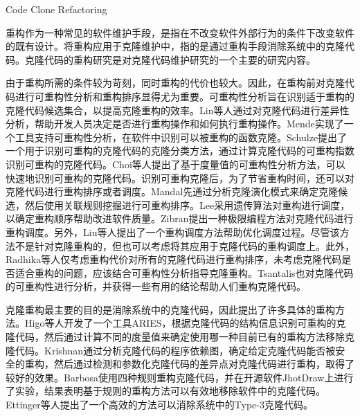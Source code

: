 {Code Clone Refactoring}
\label{ref-clonerefactoring}

重构作为一种常见的软件维护手段，是指在不改变软件外部行为的条件下改变软件的既有设计\cite{kerievsky2006重构与模式}。将重构应用于克隆维护中，指的是通过重构手段消除系统中的克隆代码。克隆代码的重构研究是对克隆代码维护研究的一个主要的研究内容。

由于重构所需的条件较为苛刻，同时重构的代价也较大。因此，在重构前对克隆代码进行可重构性分析和重构排序显得尤为重要。可重构性分析旨在识别适于重构的克隆代码候选集合，以提高克隆重构的效率\cite{lin2014detecting}\cite{mende2009evaluation}\cite{schulze2008towards}\cite{choi2011extracting}。Lin等人通过对克隆代码进行差异性分析，帮助开发人员决定是否进行重构操作和如何执行重构操作\cite{lin2014detecting}。Mende实现了一个工具支持可重构性分析，在软件中识别可以被重构的函数克隆\cite{mende2009evaluation}。Schulze提出了一个用于识别可重构的克隆代码的克隆分类方法，通过计算克隆代码的可重构指数识别可重构的克隆代码\cite{schulze2008towards}。Choi等人提出了基于度量值的可重构性分析方法，可以快速地识别可重构的克隆代码\cite{choi2011extracting}。识别可重构克隆后，为了节省重构时间，还可以对克隆代码进行重构排序或者调度\cite{mandal2014automatic}\cite{lee2011automated}\cite{zibran2011constraint}。Mandal先通过分析克隆演化模式来确定克隆候选，然后使用关联规则挖掘进行可重构排序\cite{mandal2014automatic}。Lee采用遗传算法对重构进行调度，以确定重构顺序帮助改进软件质量\cite{lee2011automated}。Zibran提出一种极限编程方法对克隆代码进行重构调度\cite{zibran2011constraint}。另外，Liu等人提出了一个重构调度方法帮助优化调度过程\cite{liu2012schedule}。尽管该方法不是针对克隆重构的，但也可以考虑将其应用于克隆代码的重构调度上。此外，Radhika等人仅考虑重构代价对所有的克隆代码进行重构排序，未考虑克隆代码是否适合重构的问题\cite{venkatasubramanyam2013prioritizing}，应该结合可重构性分析指导克隆重构。Tsantalis也对克隆代码的可重构性进行分析，并获得一些有用的结论帮助人们重构克隆代码\cite{tsantalis2015assessing}。

克隆重构最主要的目的是消除系统中的克隆代码，因此提出了许多具体的重构方法\cite{higo2008metric}\cite{krishnan2014unification}\cite{barbosa2013removing}\cite{ettinger2017efficient}。Higo等人开发了一个工具ARIES，根据克隆代码的结构信息识别可重构的克隆代码，然后通过计算不同的度量值来确定使用哪一种目前已有的重构方法移除克隆代码\cite{higo2008metric}。Krishnan通过分析克隆代码的程序依赖图，确定给定克隆代码能否被安全的重构，然后通过检测和参数化克隆代码的差异点对克隆代码进行重构，取得了较好的效果\cite{krishnan2014unification}。Barbosa使用四种规则重构克隆代码，并在开源软件JhotDraw上进行了实验，结果表明基于规则的重构方法可以有效地移除软件中的克隆代码\cite{barbosa2013removing}。Ettinger等人提出了一个高效的方法可以消除系统中的Type-3克隆代码\cite{ettinger2017efficient}。

